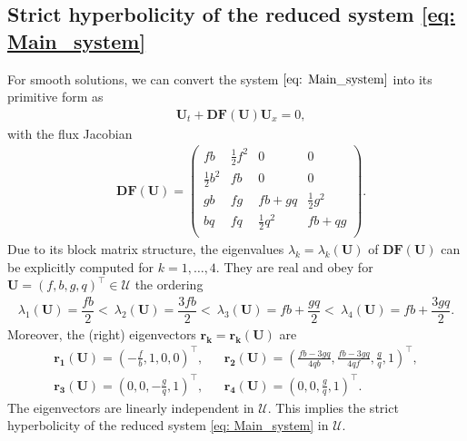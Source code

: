 \documentclass[11pt]{article}
\numberwithin{equation}{section}
\newtheorem{counter example}[theorem]{Counter Example}
\begin{document}
{\subsection{Strict hyperbolicity of the reduced system \eqref{eq: Main_system}}\label{subsec: 3.2}
For smooth solutions, we can convert the system $\eqref{eq: Main_system}$ into its primitive form as
\begin{align*}%
&\mathbf{U}_t+\mathbf{DF}(\mathbf{U})  \mathbf{U}_x=0,
\end{align*}
with the flux Jacobian 
\begin{align}
&\mathbf{DF}(\mathbf{U})=\left(
\begin{array}{cccc}
fb & \frac 12 f^2 & 0 & 0\\
\frac 12 b^2 & fb & 0 & 0\\
gb & fg & fb+gq & \frac 12 g^2\\
bq & fq & \frac 12 q^2 & fb+qg \\
\end{array}
\right). \nonumber
\end{align}
Due to its block matrix structure, the eigenvalues $\lambda_k= \lambda_k(\mathbf{U})$ of $\mathbf{DF}(\mathbf{U})$ can be explicitly  computed for 
$k=1,\ldots,4$. They are real and obey  for $\mathbf{U}=(f,b,g,q)^{\top}\in \mathcal{U}$ the ordering
\begin{align}\label{eigenvalues}
\lambda_1(\mathbf{U})=\dfrac{fb}{2}<~\lambda_2(\mathbf{U})=\dfrac{3fb}{2}<~\lambda_3(\mathbf{U})=fb+\dfrac{gq}{2}<~\lambda_4(\mathbf{U})=fb+\dfrac{3gq}{2}.
\end{align}
Moreover, the (right) eigenvectors $\mathbf{r_k}= \mathbf{r_k}(\mathbf{U})$ are
\begin{equation}\label{righteigenvectors}
\begin{array}{rcl}\displaystyle 
\mathbf{r_1}(\mathbf{U})= \left(-\frac{f}{b},1,0,0\right)^{\top}, && \!\!\!\!\!\! \displaystyle \mathbf{r_2}(\mathbf{U})=\left(\frac{fb-3gq}{4qb},\frac{fb-3gq}{4qf},\frac{g}{q},1\right)^{\top},\\[3ex]\displaystyle 
\mathbf{r_3}(\mathbf{U})=\left(0,0,-\frac{g}{q},1\right)^{\top}, & & \!\!\!\!\!\! \displaystyle \mathbf{r_4}(\mathbf{U})=\left(0,0,\frac{g}{q},1\right)^{\top}.
\end{array}
\end{equation}
The eigenvectors are linearly independent in $\mathcal U$.  This implies the strict hyperbolicity of the reduced system \eqref{eq: Main_system} in $\mathcal U$.

}
\end{document}
